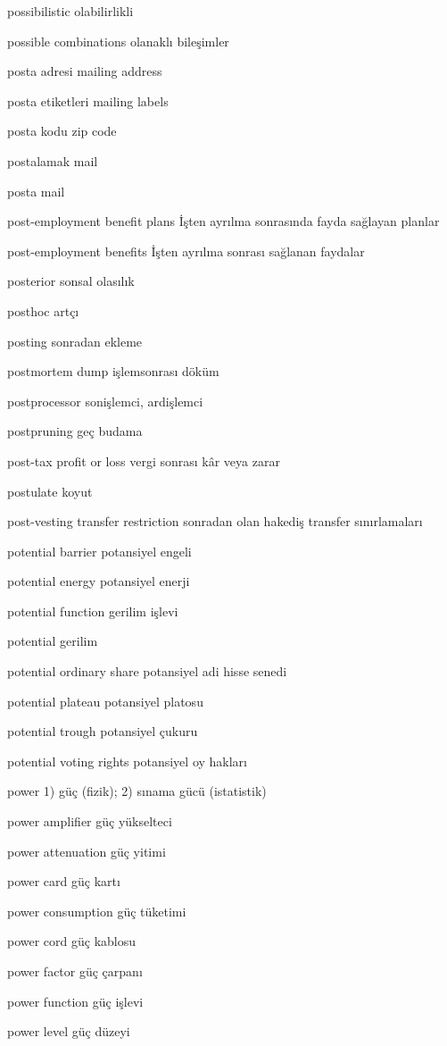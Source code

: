 \documentclass[12pt,fleqn]{article}\usepackage{../../common}
\begin{document}
possibilistic olabilirlikli

possible combinations olanaklı bileşimler

posta adresi mailing address

posta etiketleri mailing labels

posta kodu zip code

postalamak mail

posta mail

post-employment benefit plans İşten ayrılma sonrasında fayda sağlayan planlar

post-employment benefits İşten ayrılma sonrası sağlanan faydalar

posterior sonsal olasılık

posthoc artçı

posting sonradan ekleme

postmortem dump işlemsonrası döküm

postprocessor sonişlemci, ardişlemci

postpruning geç budama

post-tax profit or loss vergi sonrası kâr veya zarar

postulate koyut

post-vesting transfer restriction sonradan olan hakediş transfer sınırlamaları

potential barrier potansiyel engeli

potential energy potansiyel enerji

potential function gerilim işlevi

potential gerilim

potential ordinary share potansiyel adi hisse senedi

potential plateau potansiyel platosu

potential trough potansiyel çukuru

potential voting rights potansiyel oy hakları

power 1) güç (fizik); 2) sınama gücü (istatistik)

power amplifier güç yükselteci

power attenuation güç yitimi

power card güç kartı

power consumption güç tüketimi

power cord güç kablosu

power factor güç çarpanı

power function güç işlevi

power level güç düzeyi
\end{document}
